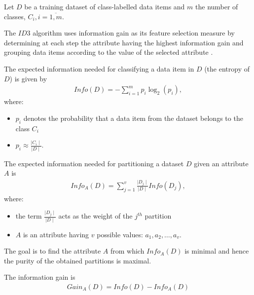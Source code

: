 Let $D$ be a training dataset of class-labelled data items and $m$ the number of classes, $C_{i}, i = \overline{1,m} $. 

The $ID3$ algorithm uses information gain as its feature selection measure by determining at each step the attribute having the highest information gain and grouping data items according to the value of the selected attribute \cite{Han06DataMining}. 

\begin{definition}
The expected information needed for classifying a data item in $D$ (the entropy of $D$) is given by
\begin{align}
Info(D) = - \sum_{i=1}^{m}p_{i}\log_{2}(p_{i}),
\end{align}
where: 
\begin{itemize}
\item $p_{i}$ denotes the probability that a data item from the dataset belongs to the class $C_{i}$
\item $p_{i} \approx \frac{\mid C_{i} \mid }{\mid D \mid} $.
\end{itemize}
\end{definition}

\begin{definition}
The expected information needed for partitioning a dataset $D$ given an attribute $A$ is
\begin{align}
Info_{A}(D)=\sum_{j=1}^{v} \frac{\mid D_{j} \mid}{\mid D \mid} Info(D_{j}),
\end{align}
where:
\begin{itemize}
\item the term $\frac{\mid D_{j} \mid}{\mid D \mid}$ acts as the weight of the $j^{th}$ partition
\item $A$ is an attribute having $v$ possible values: ${a_{1}, a_{2}, \dots , a_{v} }$.
\end{itemize}
\end{definition}

\begin{remark}
The goal is to find the attribute $A$ from which $Info_{A}(D)$ is minimal and hence the purity of the obtained partitions is maximal.
\end{remark}

\begin{definition}
The information gain is 
\begin{align}
Gain_{A}(D) = Info(D) - Info_{A} (D)
\end{align}
\end{definition}

